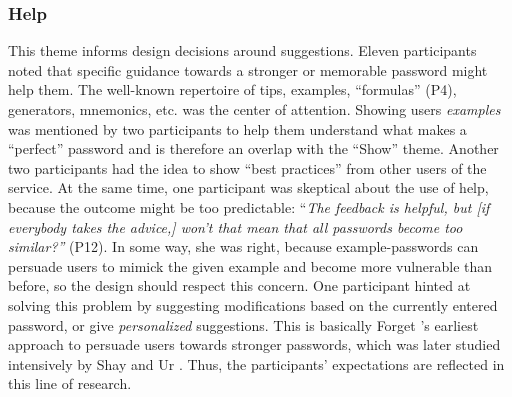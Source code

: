

\subsubsection{Help}

This theme informs design decisions around suggestions. Eleven participants noted that specific guidance towards a stronger or memorable password might help them. The well-known repertoire of tips, examples, ``formulas'' (P4), generators, mnemonics, etc. was the center of attention. Showing users \textit{examples} was mentioned by two participants to help them understand what makes a ``perfect'' password and is therefore an overlap with the ``Show'' theme. Another two participants had the idea to show ``best practices'' from other users of the service. At the same time, one participant was skeptical about the use of help, because the outcome might be too predictable: ``\textit{The feedback is helpful, but [if everybody takes the advice,] won't that mean that all passwords become too similar?''} (P12). In some way, she was right, because example-passwords can persuade users to mimick the given example and become more vulnerable than before, so the design should respect this concern. One participant hinted at solving this problem by suggesting modifications based on the currently entered password, or give \textit{personalized} suggestions. This is basically Forget \etal's earliest approach to persuade users towards stronger passwords, which was later studied intensively by Shay \etal \cite{Shay2015SpoonfulOfSugar} and Ur \etal \cite{Ur2017DataDrivenPWMeter}. Thus, the participants' expectations are reflected in this line of research.

